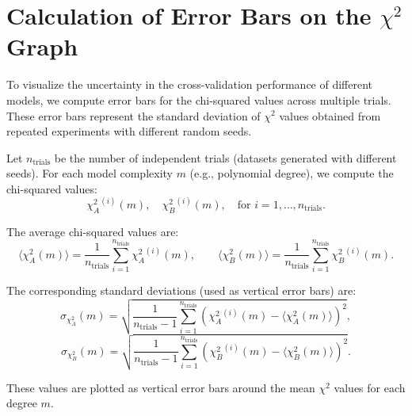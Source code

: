 \documentclass{article}
\begin{document}
\section*{Calculation of Error Bars on the $\chi^2$ Graph}

To visualize the uncertainty in the cross-validation performance of different models, we compute error bars for the chi-squared values across multiple trials. These error bars represent the standard deviation of $\chi^2$ values obtained from repeated experiments with different random seeds.

Let $n_{\text{trials}}$ be the number of independent trials (datasets generated with different seeds). For each model complexity $m$ (e.g., polynomial degree), we compute the chi-squared values:
\[
\chi^2_A^{(i)}(m), \quad \chi^2_B^{(i)}(m), \quad \text{for } i = 1, \ldots, n_{\text{trials}}.
\]

The average chi-squared values are:
\[
\langle \chi^2_A(m) \rangle = \frac{1}{n_{\text{trials}}} \sum_{i=1}^{n_{\text{trials}}} \chi^2_A^{(i)}(m), \qquad
\langle \chi^2_B(m) \rangle = \frac{1}{n_{\text{trials}}} \sum_{i=1}^{n_{\text{trials}}} \chi^2_B^{(i)}(m).
\]

The corresponding standard deviations (used as vertical error bars) are:
\[
\sigma_{\chi^2_A}(m) = \sqrt{ \frac{1}{n_{\text{trials}} - 1} \sum_{i=1}^{n_{\text{trials}}} \left( \chi^2_A^{(i)}(m) - \langle \chi^2_A(m) \rangle \right)^2 },
\]
\[
\sigma_{\chi^2_B}(m) = \sqrt{ \frac{1}{n_{\text{trials}} - 1} \sum_{i=1}^{n_{\text{trials}}} \left( \chi^2_B^{(i)}(m) - \langle \chi^2_B(m) \rangle \right)^2 }.
\]

These values are plotted as vertical error bars around the mean $\chi^2$ values for each degree $m$.
\end{document}
